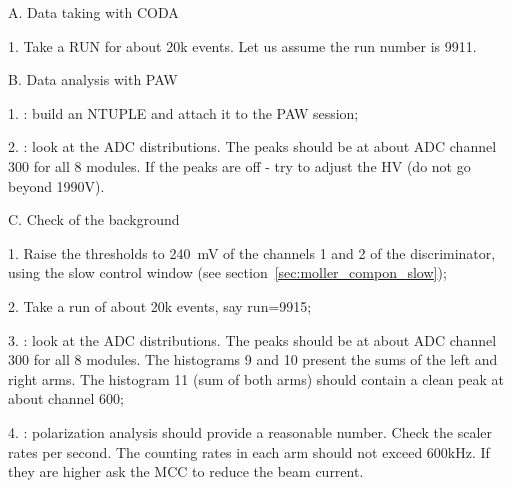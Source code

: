 {\begin{list}{}{\setlength{\itemsep}{0.5cm}}
  \item[A.] Data taking with CODA
        \begin{list}{}{\setlength{\itemsep}{0.cm}}
             \item[1.] Take a RUN for about 20k events. Let us assume the run 
                       number is 9911.
        \end{list}
  \item[B.] Data analysis with PAW
        \begin{list}{--}{\setlength{\itemsep}{0.cm}}
             \item[1.]  : build an NTUPLE and 
                       attach it to the PAW session;
             \item[2.]  : look at the 
                       ADC distributions. The peaks should be at about ADC channel 300
                       for all 8 modules. If the peaks are off - try to adjust
                       the HV (do not go beyond 1990V).
        \end{list}
  \item[C.] Check of the background
        \begin{list}{}{\setlength{\itemsep}{0.cm}}
             \item[1.] Raise the thresholds to 240~mV of the channels 1 and 2
                       of the discriminator, using the slow control window 
                       (see section~\ref{sec:moller_compon_slow});
             \item[2.] Take a run of about 20k events, say run=9915;
             \item[3.]  : look at the 
                       ADC distributions. The peaks should be at about ADC channel 300
                       for all 8 modules. The histograms 9 and 10 present the sums
                       of the left and right arms.
                       The histogram 11 (sum of both arms) should contain a clean peak at
                       about channel 600;
             \item[4.] : polarization analysis should
                       provide a reasonable number. Check the scaler rates per second.
                       The counting rates in each arm should not exceed 600kHz. If they
                       are higher ask the MCC to reduce the beam current.
        \end{list}
\end{list}

}
